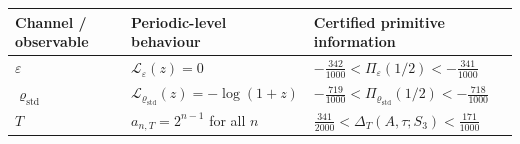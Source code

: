 \begin{center}
\footnotesize
\begin{tabular}{@{}p{}p{}p{}@{}}
\toprule
Channel / observable & Periodic-level behaviour & Certified primitive information \\
\midrule
\(\varepsilon\) &
\(\mathcal L_\varepsilon(z)=0\) &
\(-\frac{342}{1000}<\Pi_\varepsilon(1/2)<-\frac{341}{1000}\) \\
\(\varrho_{\mathrm{std}}\) &
\(\mathcal L_{\varrho_{\mathrm{std}}}(z)=-\log(1+z)\) &
\(-\frac{719}{1000}<\Pi_{\varrho_{\mathrm{std}}}(1/2)<-\frac{718}{1000}\) \\
\(T\) &
\(a_{n,T}=2^{n-1}\) for all \(n\) &
\(\frac{341}{2000}<\Delta_T(A,\tau;S_3)<\frac{171}{1000}\) \\
\bottomrule
\end{tabular}
\end{center}



